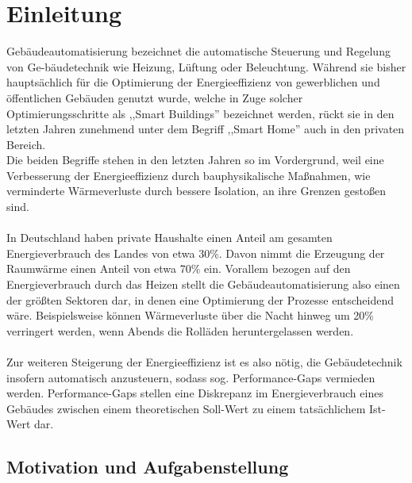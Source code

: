 \clearpage
\chapter{\textbf{Einleitung}}\label{einleitung}



Gebäudeautomatisierung bezeichnet die automatische Steuerung und Regelung von Ge-bäudetechnik 
wie Heizung, Lüftung oder Beleuchtung. Während sie bisher hauptsächlich für die Optimierung 
der Energieeffizienz von gewerblichen und öffentlichen Gebäuden genutzt wurde, welche in 
Zuge solcher Optimierungsschritte als ,,Smart Buildings'' bezeichnet werden, 
rückt sie in den letzten Jahren zunehmend unter dem Begriff ,,Smart Home'' auch in den privaten 
Bereich.\\
Die beiden Begriffe stehen in den letzten Jahren so im Vordergrund, weil eine
Verbesserung der Energieeffizienz durch bauphysikalische Maßnahmen, wie verminderte 
Wärmeverluste durch bessere Isolation, an ihre Grenzen gestoßen sind.
\\\\
In Deutschland haben private Haushalte einen Anteil am gesamten Energieverbrauch des Landes von 
etwa 30\%. Davon nimmt die Erzeugung der Raumwärme einen Anteil von etwa 70\% ein. Vorallem bezogen
auf den Energieverbrauch durch das Heizen stellt die Gebäudeautomatisierung also einen der größten
Sektoren dar, in denen eine Optimierung der Prozesse entscheidend wäre. Beispielsweise können Wärmeverluste
über die Nacht hinweg um 20\% verringert werden, wenn Abends die Rolläden heruntergelassen werden.\\\\
Zur weiteren Steigerung der Energieeffizienz ist es also nötig, die Gebäudetechnik insofern
automatisch anzusteuern, sodass sog. Performance-Gaps vermieden werden. Performance-Gaps
stellen eine Diskrepanz im Energieverbrauch eines Gebäudes zwischen einem theoretischen 
Soll-Wert zu einem tatsächlichem Ist-Wert dar.\\


\section{Motivation und Aufgabenstellung}


